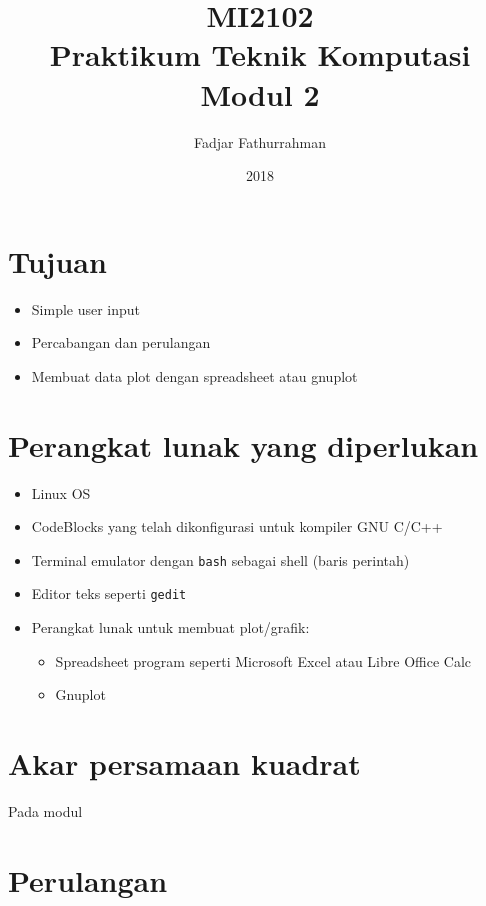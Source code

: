 \documentclass[a4paper,11pt]{extarticle}
\title{
MI2102\\
Praktikum Teknik Komputasi\\
Modul 2}
\author{Fadjar Fathurrahman}
\date{2018}
\begin{document}
\maketitle

\section{Tujuan}
\begin{itemize}
\item Simple user input
\item Percabangan dan perulangan
\item Membuat data plot dengan spreadsheet atau gnuplot
\end{itemize}

\section{Perangkat lunak yang diperlukan}
\begin{itemize}
\item Linux OS
\item CodeBlocks yang telah dikonfigurasi untuk kompiler GNU C/C++
\item Terminal emulator dengan \texttt{bash} sebagai shell (baris perintah)
\item Editor teks seperti \texttt{gedit}
\item Perangkat lunak untuk membuat plot/grafik:
\begin{itemize}
\item Spreadsheet program seperti \textsf{Microsoft Excel} atau \textsf{Libre Office Calc}
\item \textsf{Gnuplot}
\end{itemize}
\end{itemize}

\section{Akar persamaan kuadrat}
Pada modul


\section{Perulangan}
\end{document}
